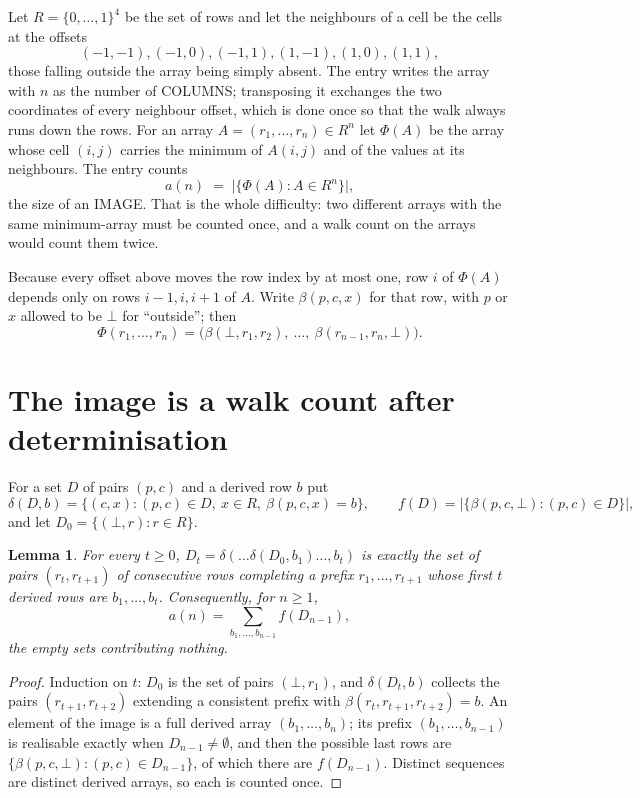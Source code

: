 \documentclass[11pt,a4paper]{article}
\theoremstyle{plain}
\newtheorem{lemma}[theorem]{Lemma}
\theoremstyle{definition}
\begin{document}
Let $R=\{0,\dots,1\}^{4}$ be the set of rows and let the neighbours of
a cell be the cells at the offsets
\[
(-1,-1), (-1,0), (-1,1), (1,-1), (1,0), (1,1),
\]
those falling outside the array being simply absent. The entry writes the array with $n$ as the number of COLUMNS; transposing it exchanges the two coordinates of every neighbour offset, which is done once so that the walk always runs down the rows. For an array
$A=(r_1,\dots,r_n)\in R^n$ let $\Phi(A)$ be the array whose cell $(i,j)$ carries the
minimum of $A(i,j)$ and of the values at its neighbours. The entry counts
\[
a(n)\;=\;\bigl|\{\Phi(A):A\in R^n\}\bigr| ,
\]
the size of an IMAGE. That is the whole difficulty: two different arrays with the same
minimum-array must be counted once, and a walk count on the arrays would count them twice.

Because every offset above moves the row index by at most one, row $i$ of
$\Phi(A)$ depends only on rows $i-1,i,i+1$ of $A$. Write $\beta(p,c,x)$ for that row, with $p$
or $x$ allowed to be $\bot$ for ``outside''; then
\[
\Phi(r_1,\dots,r_n)=\bigl(\beta(\bot,r_1,r_2),\ \dots,\ \beta(r_{n-1},r_n,\bot)\bigr).
\]

\section{The image is a walk count after determinisation}

For a set $D$ of pairs $(p,c)$ and a derived row $b$ put
\[
\delta(D,b)=\{(c,x):(p,c)\in D,\ x\in R,\ \beta(p,c,x)=b\},\qquad
f(D)=\bigl|\{\beta(p,c,\bot):(p,c)\in D\}\bigr| ,
\]
and let $D_0=\{(\bot,r):r\in R\}$.

\begin{lemma}\label{lem:det}
For every $t\ge0$, $D_t=\delta(\dots\delta(D_0,b_1)\dots,b_t)$ is exactly the set of pairs
$(r_t,r_{t+1})$ of consecutive rows completing a prefix $r_1,\dots,r_{t+1}$ whose first $t$
derived rows are $b_1,\dots,b_t$. Consequently, for $n\ge1$,
\[
a(n)=\sum_{b_1,\dots,b_{n-1}}f(D_{n-1}),
\]
the empty sets contributing nothing.
\end{lemma}

\begin{proof}
Induction on $t$: $D_0$ is the set of pairs $(\bot,r_1)$, and $\delta(D_t,b)$ collects the
pairs $(r_{t+1},r_{t+2})$ extending a consistent prefix with
$\beta(r_t,r_{t+1},r_{t+2})=b$. An element of the image is a full derived array
$(b_1,\dots,b_n)$; its prefix $(b_1,\dots,b_{n-1})$ is realisable exactly when
$D_{n-1}\neq\emptyset$, and then the possible last rows are
$\{\beta(p,c,\bot):(p,c)\in D_{n-1}\}$, of which there are $f(D_{n-1})$. Distinct sequences
are distinct derived arrays, so each is counted once.
\end{proof}
\end{document}
